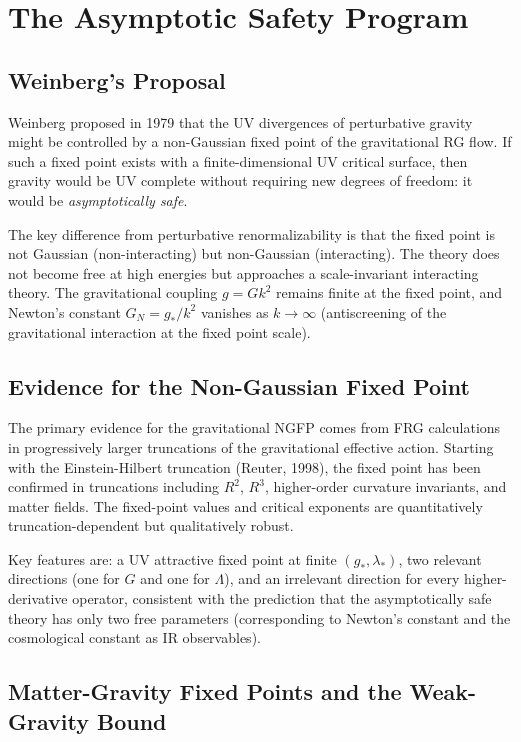 \documentclass[12pt,a4paper,oneside]{book}
\theoremstyle{definition}
\theoremstyle{plain}
\theoremstyle{remark}
\begin{document}
\chapter{The Asymptotic Safety Program}

\section{Weinberg's Proposal}

Weinberg proposed in 1979 that the UV divergences of perturbative gravity
might be controlled by a non-Gaussian fixed point of the gravitational RG
flow. If such a fixed point exists with a finite-dimensional UV critical
surface, then gravity would be UV complete without requiring new degrees of
freedom: it would be \emph{asymptotically safe}.

The key difference from perturbative renormalizability is that the fixed point
is not Gaussian (non-interacting) but non-Gaussian (interacting). The theory
does not become free at high energies but approaches a scale-invariant
interacting theory. The gravitational coupling $g = Gk^2$ remains finite at
the fixed point, and Newton's constant $G_N = g_*/k^2$ vanishes as $k\to\infty$
(antiscreening of the gravitational interaction at the fixed point scale).

\section{Evidence for the Non-Gaussian Fixed Point}

The primary evidence for the gravitational NGFP comes from FRG calculations
in progressively larger truncations of the gravitational effective action.
Starting with the Einstein-Hilbert truncation (Reuter, 1998), the fixed point
has been confirmed in truncations including $R^2$, $R^3$, higher-order
curvature invariants, and matter fields. The fixed-point values and critical
exponents are quantitatively truncation-dependent but qualitatively robust.

Key features are: a UV attractive fixed point at finite $(g_*, \lambda_*)$,
two relevant directions (one for $G$ and one for $\Lambda$), and an irrelevant
direction for every higher-derivative operator, consistent with the prediction
that the asymptotically safe theory has only two free parameters (corresponding
to Newton's constant and the cosmological constant as IR observables).

\section{Matter-Gravity Fixed Points and the Weak-Gravity Bound}
\end{document}
